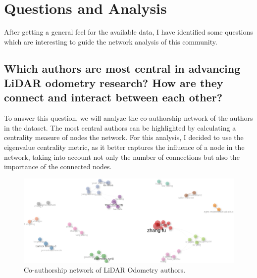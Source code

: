 \documentclass{article}
\begin{document}
\section{Questions and Analysis}
After getting a general feel for the available data, I have identified some questions which are interesting to guide the network analysis of this community.

\subsection{Which authors are most central in advancing LiDAR odometry research? How are they connect and interact between each other?}

To answer this question, we will analyze the co-authorship network of the authors in the dataset. The most central authors can be highlighted by calculating a centrality measure of nodes the network. For this analysis, I decided to use the eigenvalue centrality metric, as it better captures the influence of a node in the network, taking into account not only the number of connections but also the importance of the connected nodes.

\begin{figure}[!htbp]
    \centering
    \includegraphics[width=1.0\textwidth]{img/coauth_network.png}
    \caption{Co-authorship network of LiDAR Odometry authors.}
    \label{fig:coauth_network}
\end{figure}
\end{document}
